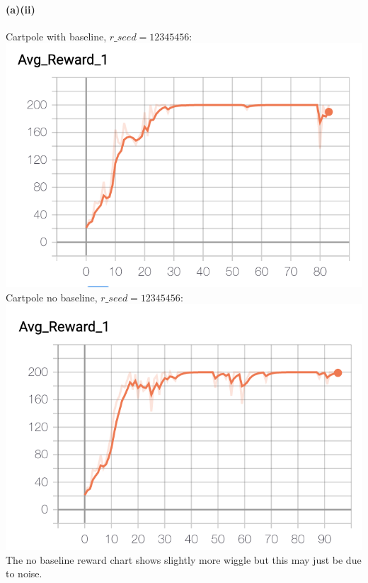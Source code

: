 \documentclass[10pt,a4paper]{article}
\begin{document}
  \paragraph{(a)(ii)}
  Cartpole with baseline, $r\_seed=12345456$: \\  
  \includegraphics[scale=0.5]{images/cartpole_baseline_12345456_avg_reward.png} \\  
  Cartpole no baseline, $r\_seed=12345456$: \\  
  \includegraphics[scale=0.5]{images/cartpole_nobaseline_12345456_avg_reward.png} \\    
  The no baseline reward chart shows slightly more wiggle but this may just be due to noise. 
\end{document}
